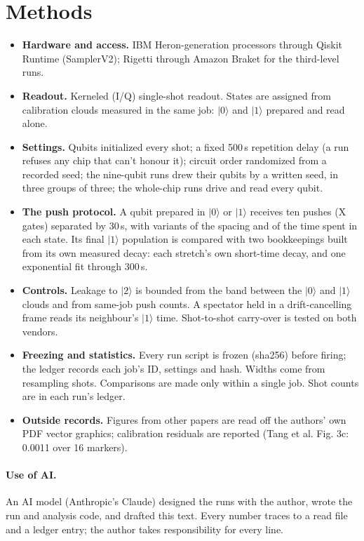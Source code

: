 \documentclass[11pt]{article}
\begin{document}
\section{Methods}
\begin{itemize}
\item \textbf{Hardware and access.} IBM Heron-generation processors through Qiskit Runtime (SamplerV2); Rigetti through Amazon Braket for the third-level runs.
\item \textbf{Readout.} Kerneled (I/Q) single-shot readout. States are assigned from calibration clouds measured in the same job: \(|0\rangle\) and \(|1\rangle\) prepared and read alone.
\item \textbf{Settings.} Qubits initialized every shot; a fixed 500\,\textmu s repetition delay (a run refuses any chip that can't honour it); circuit order randomized from a recorded seed; the nine-qubit runs drew their qubits by a written seed, in three groups of three; the whole-chip runs drive and read every qubit.
\item \textbf{The push protocol.} A qubit prepared in \(|0\rangle\) or \(|1\rangle\) receives ten pushes (X gates) separated by 30\,\textmu s, with variants of the spacing and of the time spent in each state. Its final \(|1\rangle\) population is compared with two bookkeepings built from its own measured decay: each stretch's own short-time decay, and one exponential fit through 300\,\textmu s.
\item \textbf{Controls.} Leakage to \(|2\rangle\) is bounded from the band between the \(|0\rangle\) and \(|1\rangle\) clouds and from same-job push counts. A spectator held in a drift-cancelling frame reads its neighbour's \(|1\rangle\) time. Shot-to-shot carry-over is tested on both vendors.
\item \textbf{Freezing and statistics.} Every run script is frozen (sha256) before firing; the ledger records each job's ID, settings and hash. Widths come from resampling shots. Comparisons are made only within a single job. Shot counts are in each run's ledger.
\item \textbf{Outside records.} Figures from other papers are read off the authors' own PDF vector graphics; calibration residuals are reported (Tang et al. Fig. 3c: 0.0011 over 16 markers).
\end{itemize}
\paragraph{Use of AI.} An AI model (Anthropic's Claude) designed the runs with the author, wrote the run and analysis code, and drafted this text. Every number traces to a read file and a ledger entry; the author takes responsibility for every line.
\end{document}
